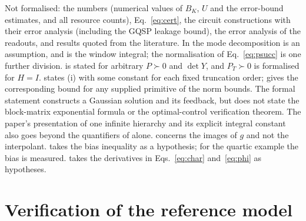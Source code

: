 \documentclass[11pt,a4paper]{article}
\theoremstyle{remark}
\begin{document}
Not formalised: the numbers (numerical values of $B_K$, $U$ and the error-bound estimates, and
all resource counts), Eq.~\eqref{eq:cert}, the circuit constructions with their error analysis (including the GQSP leakage
bound), the error analysis of the readouts, and results quoted from the literature. In
 the mode decomposition is an assumption, and  is the window integral; the normalisation of
Eq.~\eqref{eq:psucc} is one further division.  is stated for arbitrary $P\succ0$ and $\det Y$, and
$P_T\succ0$ is formalised for $H=I$.  states (i) with some
constant for each fixed truncation order;  gives the
corresponding bound for any supplied primitive of the norm bounds. The
formal statement  constructs a Gaussian solution and
its feedback, but does not state the block-matrix exponential formula or the
optimal-control verification theorem. The paper's presentation of one
infinite hierarchy and its explicit integral constant also goes beyond the
quantifiers of  alone.  concerns the images of $g$ and not the interpolant.
 takes the bias inequality as a hypothesis; for the quartic example the bias is measured.
 takes the derivatives in Eqs.~\eqref{eq:char} and~\eqref{eq:phi} as hypotheses.

\section{Verification of the reference model}
\label{app:verify}
\end{document}
